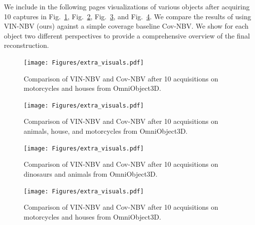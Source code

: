 We include in the following pages visualizations of various objects after acquiring 10 captures in Fig.~\ref{fig:extra_visuals_p3}, Fig.~\ref{fig:extra_visuals_p2},
Fig.~\ref{fig:extra_visuals_p1}, and
Fig.~\ref{fig:extra_visuals_p4}. We compare the results of using VIN-NBV (ours) against a simple coverage baseline Cov-NBV. We show for each object two different perspectives to provide a comprehensive overview of the final reconstruction.

\clearpage
\begin{figure}
  \centering
  \texttt{[image: Figures/extra\_visuals.pdf]}
  \vspace{-2.5em}
  \caption{
    Comparison of VIN-NBV and Cov-NBV after 10 acquisitions on motorcycles and houses from OmniObject3D\cite{wu2023omniobject3d}.
  }
  \label{fig:extra_visuals_p3}
\end{figure}

\clearpage
\begin{figure}
  \centering
  \texttt{[image: Figures/extra\_visuals.pdf]}
  \vspace{-2em}
  \caption{
    Comparison of VIN-NBV and Cov-NBV after 10 acquisitions on animals, house, and motorcycles from OmniObject3D\cite{wu2023omniobject3d}.
  }
  \label{fig:extra_visuals_p2}
\end{figure}

\clearpage
\begin{figure}
  \centering
  \texttt{[image: Figures/extra\_visuals.pdf]}
  \vspace{-2em}
  \caption{
    Comparison of VIN-NBV and Cov-NBV after 10 acquisitions on dinosaurs and animals from OmniObject3D\cite{wu2023omniobject3d}.
    }
  \label{fig:extra_visuals_p1}
\end{figure}

\clearpage
\begin{figure}
  \centering
  \texttt{[image: Figures/extra\_visuals.pdf]}
  \vspace{-20em}
  \caption{
    Comparison of VIN-NBV and Cov-NBV after 10 acquisitions on motorcycles and houses from OmniObject3D\cite{wu2023omniobject3d}.
  }
  \label{fig:extra_visuals_p4}
\end{figure}
